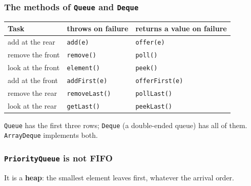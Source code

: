 \documentclass[aspectratio=169,10pt,compress]{beamer}
\begin{document}
\begin{frame}[t,fragile] \frametitle{The methods of \texttt{Queue} and \texttt{Deque}}
  \begin{center}\footnotesize
  \begin{tabular}{@{}lll@{}}
    \toprule
    \textbf{Task} & \textbf{throws on failure} & \textbf{returns a value on failure} \\
    \midrule
    add at the rear      & \texttt{add(e)}    & \texttt{offer(e)} \\
    remove the front     & \texttt{remove()}  & \texttt{poll()} \\
    look at the front    & \texttt{element()} & \texttt{peek()} \\
    \midrule
    add at the front     & \texttt{addFirst(e)} & \texttt{offerFirst(e)} \\
    remove the rear      & \texttt{removeLast()} & \texttt{pollLast()} \\
    look at the rear     & \texttt{getLast()} & \texttt{peekLast()} \\
    \bottomrule
  \end{tabular}
  \end{center}
  \vspace{0.4em}
  \small \texttt{Queue} has the first three rows; \texttt{Deque} (a double-ended queue) has all of them. \texttt{ArrayDeque} implements both.
\end{frame}




\begin{frame}[t,fragile] \frametitle{\texttt{PriorityQueue} is not FIFO}
  \small It is a \textbf{heap}: the smallest element leaves first, whatever the arrival order.
\end{frame}

\end{document}

